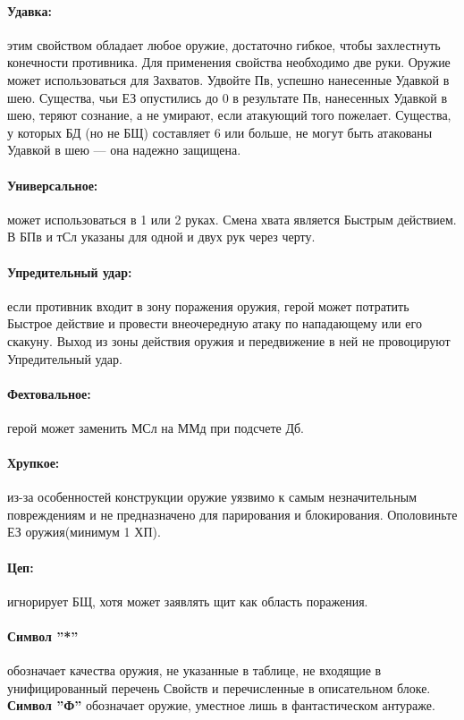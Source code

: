\paragraph{Удавка:} этим свойством обладает любое оружие, достаточно гибкое, чтобы захлестнуть конечности противника. Для применения свойства необходимо две руки. Оружие может использоваться для Захватов. Удвойте Пв, успешно нанесенные Удавкой в шею. Существа, чьи ЕЗ опустились до 0 в результате Пв, нанесенных Удавкой в шею, теряют сознание, а не умирают, если атакующий того пожелает. Существа, у которых БД (но не БЩ) составляет 6 или больше, не могут быть атакованы Удавкой в шею — она надежно защищена.
\paragraph{Универсальное:} может использоваться в 1 или 2 руках. Смена хвата является Быстрым действием. В БПв и тСл указаны для одной и двух рук через черту.
\paragraph{Упредительный удар:} если противник входит в зону поражения оружия, герой может потратить Быстрое действие и провести внеочередную атаку по нападающему или его скакуну. Выход из зоны действия оружия и передвижение в ней не провоцируют Упредительный удар.
\paragraph{Фехтовальное:} герой может заменить МСл на ММд при подсчете Дб.
\paragraph{Хрупкое:} из-за особенностей конструкции оружие уязвимо к самым незначительным повреждениям и не предназначено для парирования и блокирования. Ополовиньте ЕЗ оружия(минимум 1 ХП).
\paragraph{Цеп:} игнорирует БЩ, хотя может заявлять щит как область поражения.
\paragraph{Символ ''*''} обозначает качества оружия, не указанные в таблице, не входящие в унифицированный перечень Свойств и перечисленные в описательном блоке. \textbf{Символ ''Ф''} обозначает оружие, уместное лишь в фантастическом антураже.